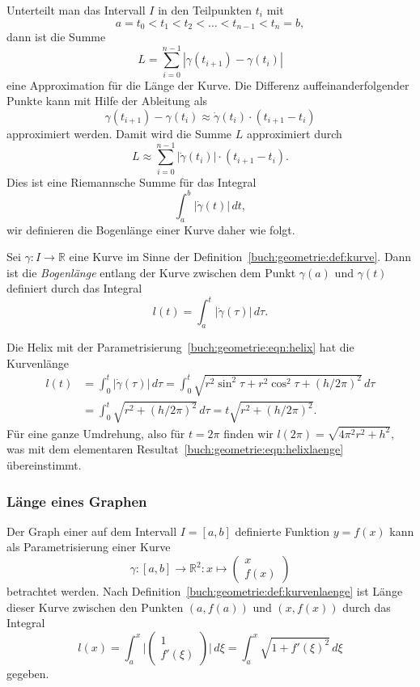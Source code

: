 Unterteilt man das Intervall $I$ in den Teilpunkten $t_i$ mit
\[
a = t_0 < t_1 < t_2 < \dots < t_{n-1} < t_n = b,
\]
dann ist die Summe
\[
L
=
\sum_{i=0}^{n-1} |\gamma(t_{i+1}) - \gamma(t_{i})|
\]
eine Approximation für die Länge der Kurve.
Die Differenz auffeinanderfolgender Punkte kann mit Hilfe der
Ableitung als
\[
\gamma(t_{i+1})-\gamma(t_i)
\approx
\dot{\gamma}(t_{i}) \cdot (t_{i+1}-t_i)
\]
approximiert werden.
Damit wird die Summe $L$ approximiert durch
\[
L\approx \sum_{i=0}^{n-1} |\dot{\gamma}(t_i)| \cdot (t_{i+1}-t_i).
\]
Dies ist eine Riemannsche Summe für das Integral
\[
\int_a^b |\dot{\gamma}(t)|\,dt,
\]
wir definieren die Bogenlänge einer Kurve daher wie folgt.

\begin{definition}
\label{buch:geometrie:def:kurvenlaenge}
Sei $\gamma\colon I\to\mathbb{R}$ eine Kurve im Sinne der
Definition~\ref{buch:geometrie:def:kurve}.
Dann ist die {\em Bogenlänge} entlang der Kurve zwischen dem Punkt
$\gamma(a)$ und $\gamma(t)$ definiert durch das
Integral
\[
l(t) = \int_{a}^t |\dot{\gamma}(\tau)|\,d\tau.
\]
\end{definition}

\begin{beispiel}
Die Helix mit der Parametrisierung~\eqref{buch:geometrie:eqn:helix}
hat die Kurvenlänge
\begin{align*}
l(t)
&=
\int_0^t |\dot{\gamma}(\tau)|\,d\tau
=
\int_0^t \sqrt{r^2\sin^2 \tau + r^2\cos^2\tau + (h/2\pi)^2}\,d\tau
\\
&=
\int_0^t \sqrt{r^2 + (h/2\pi)^2}\,d\tau
=
t\sqrt{r^2+(h/2\pi)^2}.
\end{align*}
Für eine ganze Umdrehung, also für $t=2\pi$ finden wir
\(
l(2\pi) = \sqrt{4\pi^2 r^2 + h^2},
\)
was mit dem elementaren Resultat~\eqref{buch:geometrie:eqn:helixlaenge}
übereinstimmt.
\end{beispiel}

%
%
\subsubsection{Länge eines Graphen}
Der Graph einer auf dem Intervall $I=[a,b]$ definierte Funktion
$y=f(x)$ kann als Parametrisierung einer Kurve
\[
\gamma
\colon
[a,b] \to \mathbb{R}^2
:
x \mapsto \begin{pmatrix}x\\f(x)\end{pmatrix}
\]
betrachtet werden.
Nach Definition~\ref{buch:geometrie:def:kurvenlaenge}
ist Länge dieser Kurve zwischen den Punkten $(a,f(a))$ und $(x,f(x))$
durch das Integral
\[
l(x)
=
\int_a^x \biggl| \begin{pmatrix}1\\f'(\xi)\end{pmatrix}\biggr|\,d\xi
=
\int_a^x \sqrt{1+f'(\xi)^2}\,d\xi
\]
gegeben.

